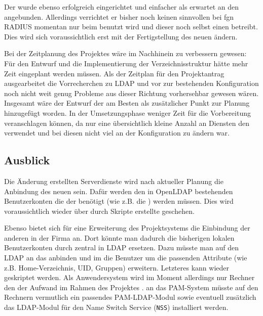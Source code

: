 \documentclass[11pt,a4paper,titlepage=firstiscover]{scrartcl} %
\begin{document}
Der  wurde ebenso erfolgreich eingerichtet und \tcr{-} 
einfacher als erwartet \tcr{-} an den  angebunden. 
Allerdings verrichtet er bisher noch keinen sinnvollen  bei fgn 
RADIUS momentan nur beim  benutzt wird und dieser 
 noch selbst einen  betreibt. Dies wird 
sich voraussichtlich erst mit der Fertigstellung des neuen  
ändern.

Bei der Zeitplanung des Projektes wäre im Nachhinein 
 zu verbessern gewesen:
Für den Entwurf und die Implementierung der Verzeichnisstruktur hätte mehr Zeit 
eingeplant werden müssen. Als der Zeitplan für den Projektantrag ausgearbeitet 
 die Vorrecherchen zu LDAP und vor  zur 
bestehenden Konfiguration noch nicht weit genug  
  Probleme aus dieser Richtung vorhersehbar 
gewesen wären. Insgesamt wäre der Entwurf der  am 
Besten als zusätzlicher Punkt zur Planung hinzugefügt worden. In der 
Umsetzungsphase  weniger Zeit für die Vorbereitung 
veranschlagen können, da nur eine übersichtlich kleine Anzahl an Diensten den 
 verwendet und bei diesen nicht viel an der Konfiguration zu 
ändern war.

\subsection{Ausblick}
Die  Änderung  erstellten Serverdienste 
wird nach aktueller Planung die Anbindung des neuen  sein. 
Dafür werden den in OpenLDAP bestehenden Benutzerkonten die  
der  benötigt (wie z.B. die ) 
 werden müssen. Dies wird voraussichtlich wieder 
über durch Skripte erstellte  geschehen.

Ebenso bietet sich für eine Erweiterung des Projektsystems die Einbindung der 
anderen  in der Firma an. Dort könnte man dadurch die 
bisherigen lokalen Benutzerkonten durch  zentral in LDAP 
ersetzen. Dazu müsste man auf den  LDAP an das 
 anbinden und im  die Benutzer um die 
passenden Attribute (wie z.B. Home-Verzeichnis, UID, Gruppen) erweitern. 
Letzteres kann wieder geskriptet werden. Als Anwendersystem wird im Moment 
allerdings nur  Rechner   den der Aufwand im Rahmen 
des Projektes .  
an das PAM-System müsste auf den Rechnern vermutlich ein passendes 
PAM-LDAP-Modul sowie eventuell zusätzlich das LDAP-Modul für den Name Switch 
Service (\texttt{NSS}) installiert werden.
\end{document}
